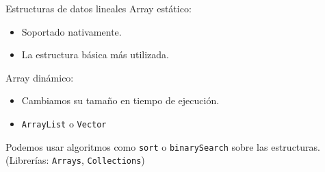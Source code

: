 \documentclass[10pt,handout]{beamer}
\begin{document}
\begin{frame}{Estructuras de datos lineales}
  Array estático:
  \begin{itemize}
  \item Soportado nativamente.
  \item La estructura básica más utilizada.
  \end{itemize}
  Array dinámico:
  \begin{itemize}
  \item Cambiamos su tamaño en tiempo de ejecución.
  \item \texttt{ArrayList} o \texttt{Vector}
  \end{itemize}
  Podemos usar algoritmos como \texttt{sort} o \texttt{binarySearch}
  sobre las estructuras. (Librerías: \texttt{Arrays},
  \texttt{Collections})
\end{frame}
\end{document}
